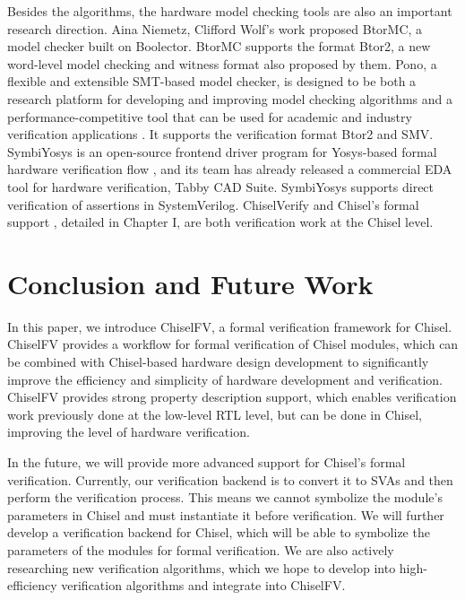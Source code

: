 \documentclass[conference]{IEEEtran}
\theoremstyle{definition}
\begin{document}
Besides the algorithms, the 
hardware model checking tools are also an important research direction. Aina Niemetz, Clifford Wolf's work \cite{niemetz2018btor2} proposed BtorMC, a model checker built on Boolector. BtorMC supports the format Btor2, a new word-level model checking and witness format also proposed by them. Pono, a flexible and extensible SMT-based model checker, is designed to be both a research platform for developing and improving model checking algorithms and a performance-competitive tool that can be used for academic and industry verification applications \cite{mann2021pono}. It supports the verification format Btor2 and SMV. SymbiYosys is an open-source frontend driver program for Yosys-based formal hardware verification flow \cite{SymbiYosys}, and its team has already released a commercial EDA tool for hardware verification, Tabby CAD Suite. SymbiYosys supports direct verification of assertions in SystemVerilog. 
ChiselVerify \cite{dobis2021chiselverify} and Chisel's formal support \cite{dobis2021open}, detailed in Chapter I, are both verification work at the Chisel level.

\section{Conclusion and Future Work}

In this paper, we introduce ChiselFV, a formal verification framework for Chisel. ChiselFV provides a workflow for formal verification of Chisel modules, which can be combined with Chisel-based hardware design development to significantly improve the efficiency and simplicity of hardware development and verification. ChiselFV provides strong property description support, which enables verification work previously done at the low-level RTL level, but can be done in Chisel, improving the level of hardware verification.

In the future, we will provide more advanced support for Chisel's formal verification. Currently, our verification backend is to convert it to SVAs and then perform the verification process. This means we cannot symbolize the module's parameters in Chisel and must instantiate it before verification. We will further develop a verification backend for Chisel, which will be able to symbolize the parameters of the modules for formal verification. We are also actively researching new verification algorithms, which we hope to develop into high-efficiency verification algorithms and integrate into ChiselFV.
\end{document}
